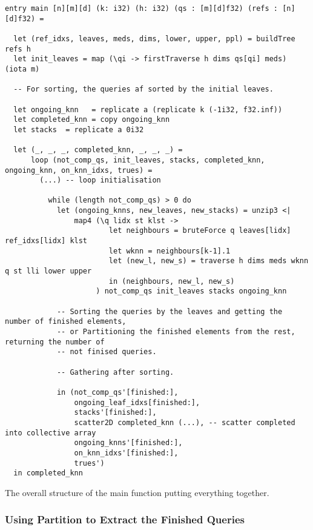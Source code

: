 \begin{listing}[H]
\begin{verbatim}
entry main [n][m][d] (k: i32) (h: i32) (qs : [m][d]f32) (refs : [n][d]f32) =

  let (ref_idxs, leaves, meds, dims, lower, upper, ppl) = buildTree refs h
  let init_leaves = map (\qi -> firstTraverse h dims qs[qi] meds) (iota m)

  -- For sorting, the queries af sorted by the initial leaves.

  let ongoing_knn   = replicate a (replicate k (-1i32, f32.inf))
  let completed_knn = copy ongoing_knn
  let stacks  = replicate a 0i32

  let (_, _, _, completed_knn, _, _, _) =
      loop (not_comp_qs, init_leaves, stacks, completed_knn, ongoing_knn, on_knn_idxs, trues) =
        (...) -- loop initialisation
          
          while (length not_comp_qs) > 0 do
            let (ongoing_knns, new_leaves, new_stacks) = unzip3 <|
                map4 (\q lidx st klst ->
                        let neighbours = bruteForce q leaves[lidx] ref_idxs[lidx] klst
                        let wknn = neighbours[k-1].1
                        let (new_l, new_s) = traverse h dims meds wknn q st lli lower upper
                        in (neighbours, new_l, new_s)
                     ) not_comp_qs init_leaves stacks ongoing_knn

            -- Sorting the queries by the leaves and getting the number of finished elements,
            -- or Partitioning the finished elements from the rest, returning the number of 
            -- not finised queries. 

            -- Gathering after sorting. 

            in (not_comp_qs'[finished:],
                ongoing_leaf_idxs[finished:],
                stacks'[finished:],
                scatter2D completed_knn (...), -- scatter completed into collective array
                ongoing_knns'[finished:],
                on_knn_idxs'[finished:],
                trues')
  in completed_knn
\end{verbatim}
\caption{The overall structure of the main function putting everything together.}
\label{lst:full}
\end{listing}




\subsubsection{Using Partition to Extract the Finished Queries}
\label{sec:pard}

